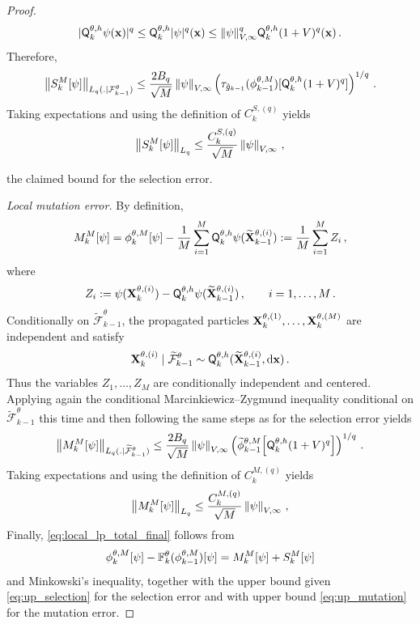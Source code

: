 \documentclass[11pt]{article}
\theoremstyle{plain}
\theoremstyle{definition}
\theoremstyle{remark}
\begin{document}
\begin{proof}
        $$
        |\mk{k}[\theta,h]\psi(\x)|^q \le \mk{k}[\theta,h]|\psi|^q(\x) \le \|\psi\|_{V,\infty}^q \mk{k}[\theta,h](1+ V)^q (\x) \eqsp.
        $$
        Therefore,
        $$
        \normEc{ \selerr{k}[\psi] }_{L_q (.|\mathcal F^\theta_{k-1})} \leq \frac{2B_q}{\sqrt M} \normEc{\psi}_{V,\infty} \left( \tau_{\approxpot{k-1}}(\mcfilter{k-1})[\mk{k}[\theta,h](1+ V)^q] \right)^{1/q} \eqsp.
        $$
        Taking expectations and using the definition of $C_k^{S,(q)}$ yields        
        \begin{equation} \label{eq:up_selection}
        \normEc{\selerr{k}[\psi]}_{L_q}  \le \frac{C_k^{S,(q)}}{\sqrt M} \normEc{\psi}_{V,\infty} \eqsp,
        \end{equation}

        the claimed bound for the selection error. 
        
        
        \noindent\emph{Local mutation error.} By definition,
        $$
        \muterr{k}[\psi] = \mcfilter{k}[\psi] -\frac1M \sum_{i=1}^M \mk{k}[\theta,h]\psi( \widetilde \X^{\theta,(i)}_{k-1} ) \eqdef \frac1M \sum_{i=1}^M Z_i \eqsp,
        $$
        where
        $$
        Z_i \eqdef \psi(\X^{\theta,(i)}_{k}) - \mk{k}[\theta,h]\psi(\widetilde \X^{\theta,(i)}_{k-1}) \eqsp, \qquad i=1,\ldots,M \eqsp.
        $$
        Conditionally on $\widetilde{\mathcal F}^\theta_{k-1}$, the propagated particles $\mathbf{X}^{\theta,(1)}_{k},\ldots,\mathbf{X}^{\theta,(M)}_{k} $ are independent and satisfy
        $$
        \X^{\theta, (i)}_{k}\mid \widetilde{\mathcal F}^\theta_{k-1}
        \sim \mk{k}[\theta,h](\widetilde \X^{\theta,(i)}_{k-1} , \rmd \x) \eqsp. 
        $$
        Thus the variables $Z_1,\ldots,Z_M$ are conditionally independent and centered.
        Applying again the conditional Marcinkiewicz--Zygmund inequality conditional on $\widetilde{\mathcal F}^\theta_{k-1}$ this time and then following the same steps as for the selection error yields
        $$
        \normEc{ \muterr{k}[\psi] }_{L_q(. \mid\widetilde{\mathcal F}^\theta_{k-1})}
        \le \frac{2B_q}{\sqrt M} \normEc{\psi}_{V,\infty} 
        \left( \tildemcfilter{k-1}[ \mk{k}[\theta,h] (1+V)^q ] \right)^{1/q} \eqsp.
        $$
        Taking expectations and using the definition of $C_k^{M,(q)}$ yields        
        \begin{equation} \label{eq:up_mutation}
            \normEc{\muterr{k}[\psi]}_{L_q} \le \frac{C_k^{M,(q)}}{\sqrt M} \normEc{\psi}_{V,\infty} \eqsp,
        \end{equation}
        Finally, \eqref{eq:local_lp_total_final} follows  from
        $$
        \mcfilter{k}[\psi] - \filtertransform{k}[\theta](\mcfilter{k-1}) [\psi] = \muterr{k}[\psi] + \selerr{k}[\psi] 
        $$
        and Minkowski's inequality, together with the upper bound given \eqref{eq:up_selection} for the selection error and with upper bound \eqref{eq:up_mutation} for the mutation error.




\end{proof}
\end{document}
